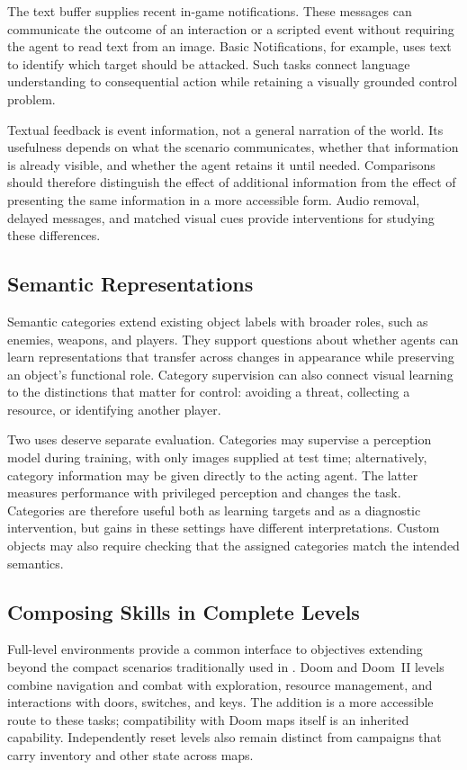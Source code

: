 The text buffer supplies recent in-game notifications. These messages can communicate the outcome of an interaction or a scripted event without requiring the agent to read text from an image. Basic Notifications, for example, uses text to identify which target should be attacked. Such tasks connect language understanding to consequential action while retaining a visually grounded control problem.

Textual feedback is event information, not a general narration of the world. Its usefulness depends on what the scenario communicates, whether that information is already visible, and whether the agent retains it until needed. Comparisons should therefore distinguish the effect of additional information from the effect of presenting the same information in a more accessible form. Audio removal, delayed messages, and matched visual cues provide interventions for studying these differences.

\subsection{Semantic Representations}
Semantic categories extend existing object labels with broader roles, such as enemies, weapons, and players. They support questions about whether agents can learn representations that transfer across changes in appearance while preserving an object's functional role. Category supervision can also connect visual learning to the distinctions that matter for control: avoiding a threat, collecting a resource, or identifying another player.

Two uses deserve separate evaluation. Categories may supervise a perception model during training, with only images supplied at test time; alternatively, category information may be given directly to the acting agent. The latter measures performance with privileged perception and changes the task. Categories are therefore useful both as learning targets and as a diagnostic intervention, but gains in these settings have different interpretations. Custom objects may also require checking that the assigned categories match the intended semantics.

\subsection{Composing Skills in Complete Levels}
Full-level environments provide a common interface to objectives extending beyond the compact scenarios traditionally used in \vzd{}. Doom and Doom~II levels combine navigation and combat with exploration, resource management, and interactions with doors, switches, and keys. The addition is a more accessible route to these tasks; compatibility with Doom maps itself is an inherited capability. Independently reset levels also remain distinct from campaigns that carry inventory and other state across maps.

